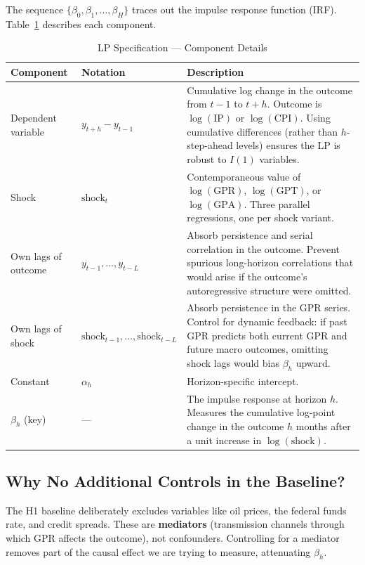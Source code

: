 \documentclass[11pt,a4paper]{article}
\begin{document}
\noindent The sequence $\{\beta_0, \beta_1, \ldots, \beta_H\}$ traces out the impulse response function (IRF). Table~\ref{tab:spec} describes each component.

\begin{table}[H]
\centering
\caption{LP Specification --- Component Details}
\label{tab:spec}
\small
\begin{tabular}{@{}l l p{8.5cm}@{}}
\toprule
\textbf{Component} & \textbf{Notation} & \textbf{Description} \\
\midrule
Dependent variable & $y_{t+h} - y_{t-1}$ & Cumulative log change in the outcome from $t{-}1$ to $t{+}h$. Outcome is $\log(\text{IP})$ or $\log(\text{CPI})$. Using cumulative differences (rather than $h$-step-ahead levels) ensures the LP is robust to $I(1)$ variables. \\
\addlinespace
Shock & $\text{shock}_t$ & Contemporaneous value of $\log(\text{GPR})$, $\log(\text{GPT})$, or $\log(\text{GPA})$. Three parallel regressions, one per shock variant. \\
\addlinespace
Own lags of outcome & $y_{t-1}, \ldots, y_{t-L}$ & Absorb persistence and serial correlation in the outcome. Prevent spurious long-horizon correlations that would arise if the outcome's autoregressive structure were omitted. \\
\addlinespace
Own lags of shock & $\text{shock}_{t-1}, \ldots, \text{shock}_{t-L}$ & Absorb persistence in the GPR series. Control for dynamic feedback: if past GPR predicts both current GPR and future macro outcomes, omitting shock lags would bias $\beta_h$ upward. \\
\addlinespace
Constant & $\alpha_h$ & Horizon-specific intercept. \\
\addlinespace
$\beta_h$ (key) & --- & The impulse response at horizon $h$. Measures the cumulative log-point change in the outcome $h$ months after a unit increase in $\log(\text{shock})$. \\
\bottomrule
\end{tabular}
\end{table}

\subsection{Why No Additional Controls in the Baseline?}

The H1 baseline deliberately excludes variables like oil prices, the federal funds rate, and credit spreads. These are \textbf{mediators} (transmission channels through which GPR affects the outcome), not confounders. Controlling for a mediator removes part of the causal effect we are trying to measure, attenuating $\beta_h$.
\end{document}
